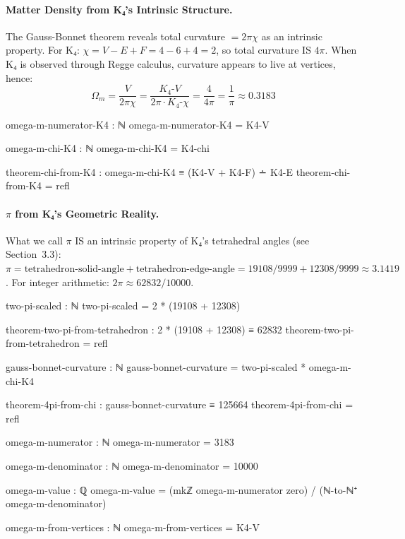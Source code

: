 \documentclass[11pt,a4paper]{book}
\begin{document}
\paragraph{Matter Density from K₄'s Intrinsic Structure.}
The Gauss-Bonnet theorem reveals total curvature $= 2\pi\chi$ as an intrinsic property.
For K₄: $\chi = V - E + F = 4 - 6 + 4 = 2$, so total curvature IS $4\pi$.
When K₄ is observed through Regge calculus, curvature appears to live at vertices, hence:
\[
\Omega_m = \frac{V}{2\pi\chi} = \frac{K_4\text{-}V}{2\pi \cdot K_4\text{-}\chi} = \frac{4}{4\pi} = \frac{1}{\pi} \approx 0.3183
\]

\begin{code}
omega-m-numerator-K4 : ℕ
omega-m-numerator-K4 = K4-V

omega-m-chi-K4 : ℕ
omega-m-chi-K4 = K4-chi

theorem-chi-from-K4 : omega-m-chi-K4 ≡ (K4-V + K4-F) ∸ K4-E
theorem-chi-from-K4 = refl

\end{code}

\paragraph{$\pi$ from K₄'s Geometric Reality.}
What we call $\pi$ IS an intrinsic property of K₄'s tetrahedral angles (see Section~3.3):
$\pi = \text{tetrahedron-solid-angle} + \text{tetrahedron-edge-angle} = 19108/9999 + 12308/9999 \approx 3.1419$.
For integer arithmetic: $2\pi \approx 62832/10000$.

\begin{code}
two-pi-scaled : ℕ
two-pi-scaled = 2 * (19108 + 12308)
  
theorem-two-pi-from-tetrahedron : 2 * (19108 + 12308) ≡ 62832
theorem-two-pi-from-tetrahedron = refl

gauss-bonnet-curvature : ℕ
gauss-bonnet-curvature = two-pi-scaled * omega-m-chi-K4

theorem-4pi-from-chi : gauss-bonnet-curvature ≡ 125664
theorem-4pi-from-chi = refl

omega-m-numerator : ℕ
omega-m-numerator = 3183

omega-m-denominator : ℕ
omega-m-denominator = 10000

omega-m-value : ℚ
omega-m-value = (mkℤ omega-m-numerator zero) / (ℕ-to-ℕ⁺ omega-m-denominator)

omega-m-from-vertices : ℕ
omega-m-from-vertices = K4-V
\end{code}
\end{document}
